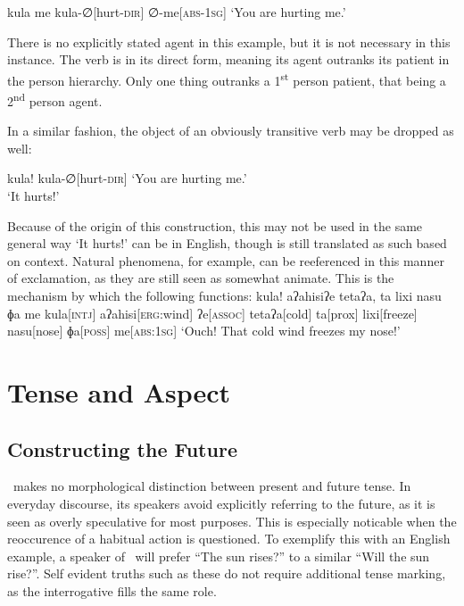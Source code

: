 \ex
\begingl
\glpreamble kula me
\endpreamble
kula-∅[hurt-\textsc{dir}]
∅-me[\textsc{abs-1sg}]
\glft `You are hurting me.'
\endgl
\xe

There is no explicitly stated agent in this example, but it is not necessary in this instance.
The verb  is in its direct form, meaning its agent outranks its patient in the person hierarchy.
Only one thing outranks a 1\textsuperscript{st} person patient, that being a 2\textsuperscript{nd} person agent.

In a similar fashion, the object of an obviously transitive verb may be dropped as well:

\ex
\begingl
\glpreamble kula!
\endpreamble
kula-∅[hurt-\textsc{dir}]
\glft `You are hurting me.'\\`It hurts!'
\endgl
\xe

Because of the origin of this construction, this may not be used in the same general way `It hurts!' can be in English, though  is still translated as such based on context.
Natural phenomena, for example, can be reeferenced in this manner of exclamation, as they are still seen as somewhat animate.
This is the mechanism by which the following functions:
\ex
\begingl
\glpreamble kula! aʔahisiʔe tetaʔa, ta lixi nasu ɸa me\endpreamble
kula[\textsc{intj}]
aʔahisi[\textsc{erg:}wind]
ʔe[\textsc{assoc}]
tetaʔa[cold]
ta[prox]
lixi[freeze]
nasu[nose]
ɸa[\textsc{poss}]
me[\textsc{abs:1sg}]
\glft `Ouch! That cold wind freezes my nose!'
\endgl
\xe

\section{Tense and Aspect}
\subsection{Constructing the Future}

\langname\ makes no morphological distinction between present and future tense.
In everyday discourse, its speakers avoid explicitly referring to the future, as it is seen as overly speculative for most purposes.
This is especially noticable when the reoccurence of a habitual action is questioned.
To exemplify this with an English example, a speaker of \langname\ will prefer ``The sun rises?'' to a similar ``Will the sun rise?''.
Self evident truths such as these do not require additional tense marking, as the interrogative fills the same role.


